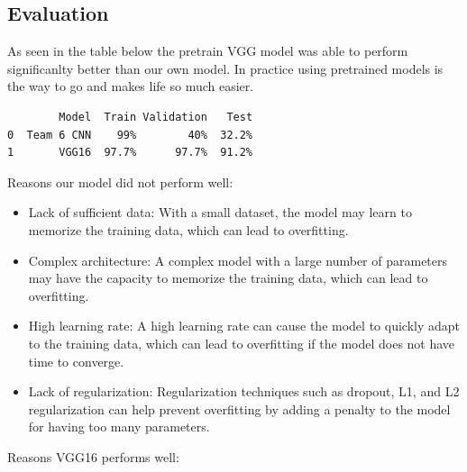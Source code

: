 \documentclass[
  letterpaper,
  DIV=11,
  numbers=noendperiod]{scrartcl}
\begin{document}
\hypertarget{evaluation}{%
\subsection{Evaluation}\label{evaluation}}

As seen in the table below the pretrain VGG model was able to perform
significanlty better than our own model. In practice using pretrained
models is the way to go and makes life so much easier.

\begin{verbatim}
        Model  Train Validation   Test
0  Team 6 CNN    99%        40%  32.2%
1       VGG16  97.7%      97.7%  91.2%
\end{verbatim}

Reasons our model did not perform well:

\begin{itemize}
\item
  Lack of sufficient data: With a small dataset, the model may learn to
  memorize the training data, which can lead to overfitting.
\item
  Complex architecture: A complex model with a large number of
  parameters may have the capacity to memorize the training data, which
  can lead to overfitting.
\item
  High learning rate: A high learning rate can cause the model to
  quickly adapt to the training data, which can lead to overfitting if
  the model does not have time to converge.
\item
  Lack of regularization: Regularization techniques such as dropout, L1,
  and L2 regularization can help prevent overfitting by adding a penalty
  to the model for having too many parameters.
\end{itemize}

Reasons VGG16 performs well:
\end{document}
